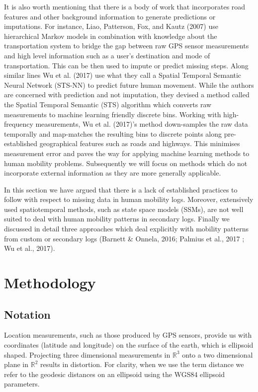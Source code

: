 \documentclass[man]{apa6}
\theoremstyle{definition}
\theoremstyle{definition}
\theoremstyle{definition}
\theoremstyle{remark}
\begin{document}
It is also worth mentioning that there is a body of work that
incorporates road features and other background information to generate
predictions or imputations. For instance, Liao, Patterson, Fox, and
Kautz (2007) use hierarchical Markov models in combination with
knowledge about the transportation system to bridge the gap between raw
GPS sensor measurements and high level information such as a user's
destination and mode of transportation. This can be then used to impute
or predict missing steps. Along similar lines Wu et al. (2017) use what
they call a Spatial Temporal Semantic Neural Network (STS-NN) to predict
future human movement. While the authors are concerned with prediction
and not imputation, they devised a method called the Spatial Temporal
Semantic (STS) algorithm which converts raw measurements to machine
learning friendly discrete bins. Working with high-frequency
measurements, Wu et al. (2017)'s method down-samples the raw data
temporally and map-matches the resulting bins to discrete points along
pre-established geographical features such as roads and highways. This
minimises measurement error and paves the way for applying machine
learning methods to human mobility problems. Subsequently we will focus
on methods which do not incorporate external information as they are
more generally applicable.

In this section we have argued that there is a lack of established
practices to follow with respect to missing data in human mobility logs.
Moreover, extensively used spatiotemporal methods, such as state space
models (SSMs), are not well suited to deal with human mobility patterns
in secondary logs. Finally we discussed in detail three approaches which
deal explicitly with mobility patterns from custom or secondary logs
(Barnett \& Onnela, 2016; Palmius et al., 2017 ; Wu et al., 2017).

\section{Methodology}\label{methodology}

\subsection{Notation}\label{notation}

Location measurements, such as those produced by GPS sensors, provide us
with coordinates (latitude and longitude) on the surface of the earth,
which is ellipsoid shaped. Projecting three dimensional measurements in
\(\mathbb{R}^3\) onto a two dimensional plane in \(\mathbb{R}^2\)
results in distortion. For clarity, when we use the term distance we
refer to the geodesic distances on an ellipsoid using the WGS84
ellipsoid parameters.
\end{document}
